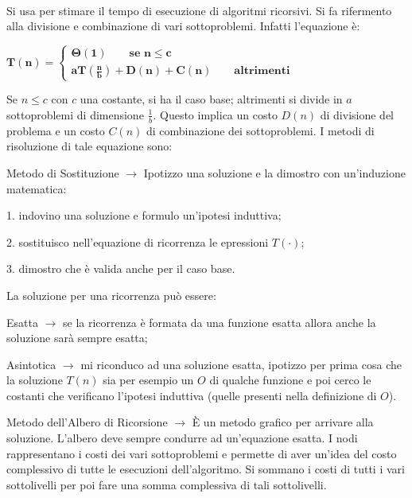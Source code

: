 \documentclass[8pt]{extarticle}
\begin{document}
\begin{formulario}
		\begin{tcenter}
		\end{tcenter}
\\
Si usa per stimare il tempo di esecuzione di algoritmi ricorsivi. Si fa rifermento alla divisione e combinazione di vari sottoproblemi. Infatti l'equazione è:
		\begin{tcenter}
$\mathbf{T(n)=		
		\begin{cases}
\Theta(1) \qquad \text{se } n\leq c\\
aT(\frac{n}{b})+D(n)+C(n) \qquad \text{altrimenti}
		\end{cases}}$
		\end{tcenter}  
Se $n\leq c$ con $c$ una costante, si ha il caso base; altrimenti si divide in $a$ sottoproblemi di dimensione $\frac{1}{b}$. Questo implica un costo $D(n)$ di divisione del problema e un costo $C(n)$ di combinazione dei sottoproblemi. I metodi di risoluzione di tale equazione sono:
		\begin{descr}{1} 
\item[Metodo di Sostituzione] $\rightarrow$ Ipotizzo una soluzione e la dimostro con un'induzione matematica:\\
			\begin{descr}{0}
\item[1.] indovino una soluzione e formulo un'ipotesi induttiva;
\item[2.] sostituisco nell'equazione di ricorrenza le epressioni $T(\cdot)$;
\item[3.] dimostro che è valida anche per il caso base.
			\end{descr}
La soluzione per una ricorrenza può essere:
			\begin{descr}{0}
\item[Esatta] $\rightarrow$ se la ricorrenza è formata da una funzione esatta allora anche la soluzione sarà sempre esatta;
\item[Asintotica] $\rightarrow$ mi riconduco ad una soluzione esatta, ipotizzo per prima cosa che la soluzione $T(n)$ sia per esempio un $O$ di qualche funzione e poi cerco le costanti che verificano l'ipotesi induttiva (quelle presenti nella definizione di $O$). 
			\end{descr}
\item[Metodo dell'Albero di Ricorsione] $\rightarrow$ È un metodo grafico per arrivare alla soluzione. L'albero deve sempre condurre ad un'equazione esatta. I nodi rappresentano i costi dei vari sottoproblemi e permette di aver un'idea del costo complessivo di tutte le esecuzioni dell'algoritmo. Si sommano i costi di tutti i vari sottolivelli per poi fare una somma complessiva di tali sottolivelli.

\end{descr}
\end{formulario}
\end{document}
